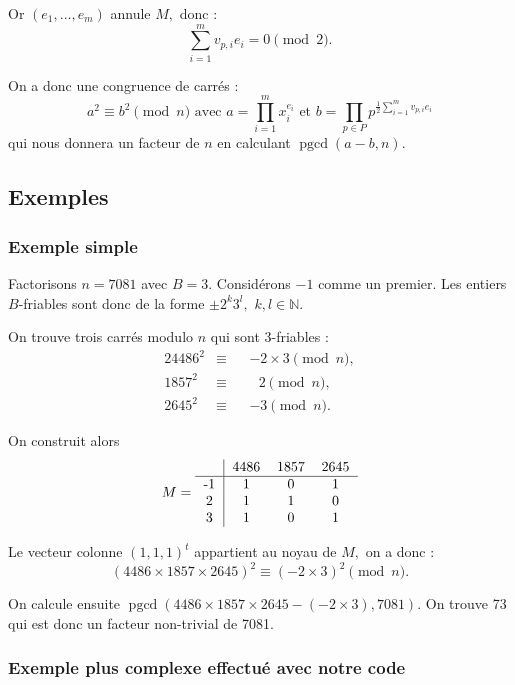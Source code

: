 \documentclass[french, 12pt, titlepage]{article}
\DeclareMathOperator{\pgcd}{pgcd}
\newcommand{\N}{\mathbb{N}}
\begin{document}
Or $(e_1, ..., e_m)$ annule $M,$ donc : \[\sum\limits_{i=1}^m v_{p,
  i}e_i = 0 \pmod 2.\]

On a donc une congruence de carrés : \[a^2 \equiv b^2 \pmod n \text{ avec } a = \prod\limits_{i=1}^m x_i^{e_i} \text{ et } b = \prod\limits_{p \in P} p^{\frac{1}{2} \sum\limits_{i=1}^m v_{p, i}e_i}\] qui nous donnera un facteur
de $n$ en calculant $\pgcd(a - b, n).$

\subsection{Exemples}

\subsubsection{Exemple simple}

Factorisons $n = 7081$ avec $B = 3.$ Considérons $-1$ comme un
premier. Les entiers $B$-friables sont donc de la forme $\pm2^k3^l,$
$k, l \in \N.$ 

On trouve trois carrés modulo $n$ qui sont 3-friables :
\begin{alignat*}{2}
4486^2 & \equiv && -\!2 \times 3 \pmod n, \\
1857^2 & \equiv && \text{ } 2 \pmod n, \\
2645^2 & \equiv && -\!3 \pmod n.
\end{alignat*}

On construit alors \[M = \begin{tabular}{c|ccc}
                            & 4486 & 1857 & 2645 \\
                           \hline
                           -1 & 1 & 0 & 1 \\
                           2 & 1 & 1 & 0 \\
                           3 & 1 & 0 & 1 \\
                         \end{tabular}\]

Le vecteur colonne $(1, 1, 1)^t$ appartient au noyau de $M,$ on a donc
: \[(4486 \times 1857 \times 2645)^2 \equiv (-2 \times 3)^2 \pmod
n.\]

On calcule ensuite $\pgcd(4486 \times 1857 \times 2645 - (-2 \times
3), 7081).$ On trouve 73 qui est donc un facteur non-trivial de 7081.

\subsubsection{Exemple plus complexe effectué avec notre code}
\end{document}
